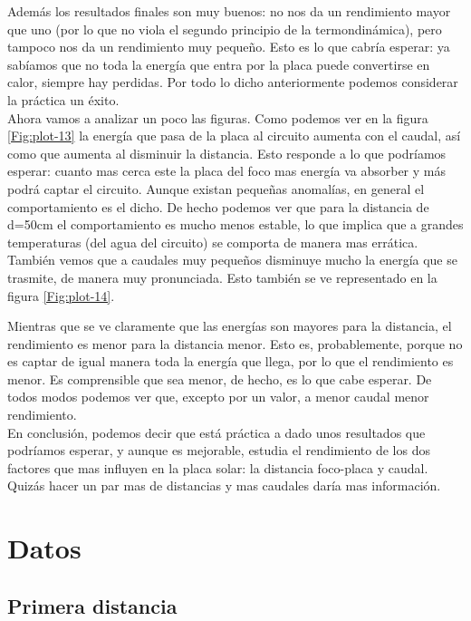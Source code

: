\documentclass[12pt,a4paper]{article}
\begin{document}
Además los resultados finales son muy buenos: no nos da un rendimiento mayor que uno (por lo que no viola el segundo principio de la termondinámica), pero tampoco nos da un rendimiento muy pequeño. Esto es lo que cabría esperar: ya sabíamos que no toda la energía que entra por la placa puede convertirse en calor, siempre hay perdidas. Por todo lo dicho anteriormente podemos considerar la práctica un éxito. \\

Ahora vamos a analizar un poco las figuras. Como podemos ver en la figura \ref{Fig:plot-13} la energía que pasa de la placa al circuito aumenta con el caudal, así como que aumenta al disminuir la distancia. Esto responde a lo que podríamos esperar: cuanto mas cerca este la placa del foco mas energía va absorber y más podrá captar el circuito. Aunque existan pequeñas anomalías, en general el comportamiento es el dicho. De hecho podemos ver que para la distancia de d=50cm el comportamiento es mucho menos estable, lo que implica que a grandes temperaturas (del agua del circuito) se comporta de manera mas errática. También vemos que a caudales muy pequeños disminuye mucho la energía que se trasmite, de manera muy pronunciada. Esto también se ve representado en la figura \ref{Fig:plot-14}. 

Mientras que se ve claramente que las energías son mayores para la distancia, el rendimiento es menor para la distancia menor. Esto es, probablemente, porque no es captar de igual manera toda la energía que llega, por lo que el rendimiento es menor. Es comprensible que sea menor, de hecho, es lo que cabe esperar. De todos modos podemos ver que, excepto por un valor, a menor caudal menor rendimiento. \\

En conclusión, podemos decir que está práctica a dado unos resultados que podríamos esperar, y aunque es mejorable, estudia el rendimiento de los dos factores que mas influyen en la placa solar: la distancia foco-placa y caudal. Quizás hacer un par mas de distancias y mas caudales daría mas información. 



\newpage


\section{Datos}  \label{Sec:datos}
\subsection{Primera distancia}
 
\end{document}
